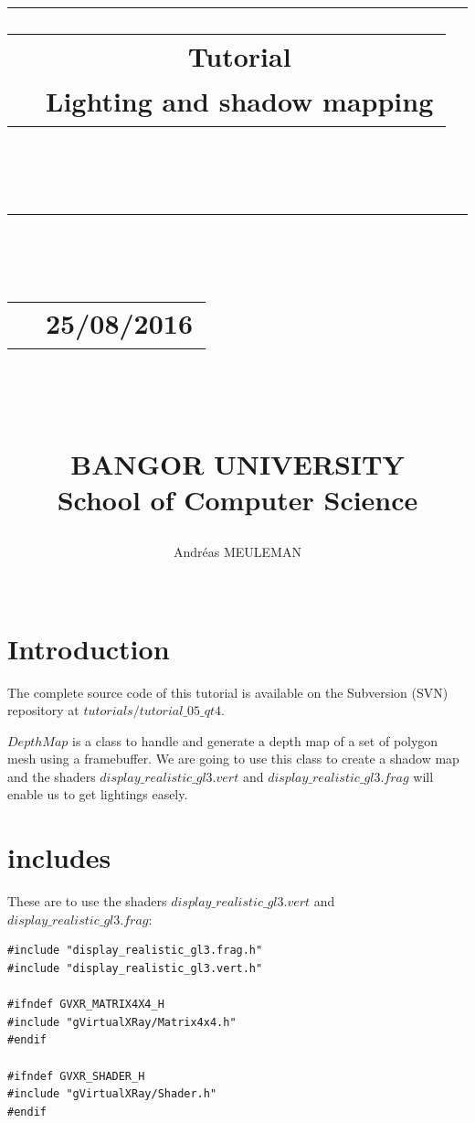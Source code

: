 \documentclass[12pt]{report}
\begin{document}
\newlength{\larg}
\setlength{\larg}{14.5cm}
\lstset{inputencoding=utf8/latin1}
\title{
{\rule{\larg}{1mm}}\vspace{7mm}
\begin{tabular}{p{0cm} c}
   & { {\textbf{Tutorial}}} \\
   & {\huge Lighting and shadow mapping} \\
\end{tabular}\\
\vspace{2mm}
{\rule{\larg}{1mm}}
\vspace{2mm} \\
\begin{tabular}{p{11cm} r}
   & {\large  25/08/2016}
\end{tabular}\\
\vspace{2cm}
\large{\textit{} \\
BANGOR UNIVERSITY\\
School of Computer Science}
\vspace{5cm}
}
\author{\begin{tabular}{p{13.7cm} r}
Andréas MEULEMAN
\end{tabular}\\
\hline }
\date{}
\maketitle

\chapter{Introduction}

	The complete source code of this tutorial is available on the Subversion (SVN) repository at $tutorials/tutorial\_05\_qt4$. 
	
	$DepthMap$ is a class to handle and generate a depth map of a set of polygon mesh using a framebuffer. We are going to use this class to create a shadow map and the shaders $display\_realistic\_gl3.vert$ and $display\_realistic\_gl3.frag$ will enable us to get lightings easely.
	
\chapter{includes}

These are to use the shaders $display\_realistic\_gl3.vert$ and $display\_realistic\_gl3.frag$:
\begin{lstlisting}
#include "display_realistic_gl3.frag.h"
#include "display_realistic_gl3.vert.h"

#ifndef GVXR_MATRIX4X4_H
#include "gVirtualXRay/Matrix4x4.h"
#endif

#ifndef GVXR_SHADER_H
#include "gVirtualXRay/Shader.h"
#endif
\end{lstlisting}
\end{document}
